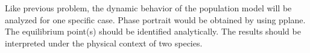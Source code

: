 Like previous problem, the dynamic behavior of the population model will be analyzed for one specific case. Phase portrait would be obtained by using pplane. The equilibrium point(s) should be identified analytically. The results should be interpreted under the physical context of two species. 